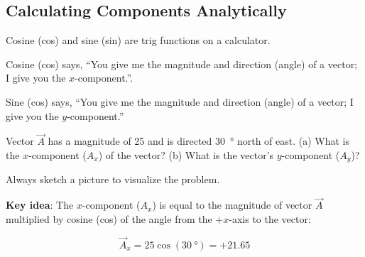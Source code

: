 \documentclass[main.tex]{subfiles}
\begin{document}
\subsection{Calculating Components Analytically}

Cosine (cos) and sine (sin) are trig functions on a calculator.

Cosine (cos) says, ``You give me the magnitude and direction (angle) of a vector; I give you the $x$-component.''.

Sine (cos) says, ``You give me the magnitude and direction (angle) of a vector; I give you the $y$-component.''

\begin{example}
    Vector $\vec{A}$ has a magnitude of 25 and is directed \SI{30}{\degree} north of east. (a) What is the $x$-component ($A_x$) of the vector? (b) What is the vector's $y$-component ($A_y$)?
\end{example}

\Solution Always sketch a picture to visualize the problem.

\begin{figure}[h!]
    \centering
\def\A{5}
\def\angle{30}
\end{figure}

\textbf{Key idea}: The $x$-component ($A_x$) is equal to the magnitude of vector $\vec{A}$ multiplied by cosine (cos) of the angle from the $+x$-axis to the vector:

\begin{equation*}
    \vec{A}_x = 25 \cos{(\SI{30}{\degree})} = +21.65
\end{equation*}
\end{document}
